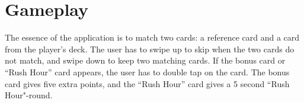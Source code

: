 \section{Gameplay}
The essence of the application is to match two cards: a reference card and a card from the player's deck. The user has to swipe up to skip when the two cards do not match, and swipe down to keep two matching cards. If the bonus card or “Rush Hour” card appears, the user has to double tap on the card. The bonus card gives five extra points, and the “Rush Hour” card gives a 5 second “Rush Hour"-round.
